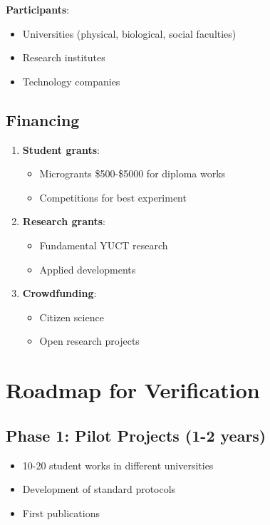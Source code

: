 \documentclass[12pt,a4paper]{article}
\begin{document}
	\textbf{Participants}:
	\begin{itemize}
		\item Universities (physical, biological, social faculties)
		\item Research institutes
		\item Technology companies
	\end{itemize}
	
	\subsection{Financing}
	
	\begin{enumerate}
		\item \textbf{Student grants}:
		\begin{itemize}
			\item Microgrants \$500-\$5000 for diploma works
			\item Competitions for best experiment
		\end{itemize}
		
		\item \textbf{Research grants}:
		\begin{itemize}
			\item Fundamental YUCT research
			\item Applied developments
		\end{itemize}
		
		\item \textbf{Crowdfunding}:
		\begin{itemize}
			\item Citizen science
			\item Open research projects
		\end{itemize}
	\end{enumerate}
	
	\section{Roadmap for Verification}
	
	\subsection{Phase 1: Pilot Projects (1-2 years)}
	\begin{itemize}
		\item 10-20 student works in different universities
		\item Development of standard protocols
		\item First publications
	\end{itemize}
	
\end{document}
